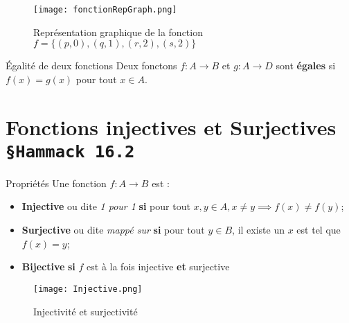 \documentclass[16pt]{report}
\begin{document}
\begin{multicols*}{2}
            

                
            \begin{figure}[H]
                \begin{center}
                    \texttt{[image: fonctionRepGraph.png]}
                \end{center}
                \caption{Représentation graphique de la fonction $f = \{(p, 0), (q, 1), (r, 2), (s, 2) \}$}
            \end{figure}


            \begin{Definitionx}{Égalité de deux fonctions}{}
                Deux fonctons $f : A \rightarrow B$ et $g : A \rightarrow D$ sont \textbf{égales} si 
                $f(x) = g(x)$ pour tout $x \in A$. 
            \end{Definitionx}



            

    \section{Fonctions injectives et Surjectives \texttt{\small{\S Hammack 16.2}}}
            

        \begin{Definitionx}{Propriétés}{}
            Une fonction $f : A \rightarrow B$ est :
            \begin{itemize}
                \item \textbf{Injective} ou dite \textit{1 pour 1} \textbf{si} pour tout 
                    $x, y \in A, x \neq y \implies f(x) \neq f(y)$; 
                \item \textbf{Surjective} ou dite \textit{mappé sur} \textbf{si} pour tout 
                    $y \in B$, il existe un $x$ est tel que $f(x) = y$; 
                \item \textbf{Bijective} \textbf{si} $f$ est à la fois injective \textbf{et} surjective  
            \end{itemize}
        \end{Definitionx}


        \begin{figure}[H]
            \begin{center}
                \texttt{[image: Injective.png]}
            \end{center}
            \caption{Injectivité et surjectivité}
        \end{figure}



\end{multicols*}
\end{document}
